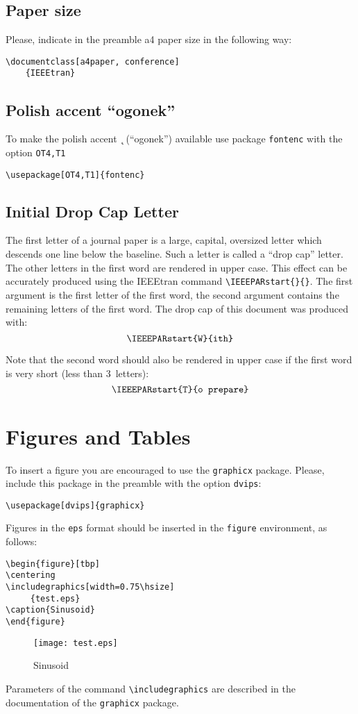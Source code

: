 \documentclass[conference]{IEEEtran}
\theoremstyle{definition}
\begin{document}
\subsection{Paper size}
Please, indicate in the preamble a4 paper size in the following way:





\begin{verbatim}
\documentclass[a4paper, conference]
    {IEEEtran}
\end{verbatim}


\subsection{Polish accent ``ogonek''}
To make the polish accent {\k \ } (``ogonek'') available use package \verb|fontenc| with the option \verb|OT4,T1|
\begin{verbatim}
\usepackage[OT4,T1]{fontenc}
\end{verbatim}

\subsection{Initial Drop Cap Letter}
 The first letter of a journal paper is a large, capital, oversized
letter which descends one line below the baseline. Such a
letter is called a ``drop cap'' letter. The other letters in the first
word are rendered in upper case. This effect can be accurately
produced using the IEEEtran command \verb|\IEEEPARstart{}{}|. The first argument is the first letter of the first word, the
second argument contains the remaining letters of the first
word. The drop cap of this document was produced with:
$$\verb|\IEEEPARstart{W}{ith}|$$

Note that the second word should also be rendered  in
upper case if the first word is very short (less than 3~letters):
$$\verb|\IEEEPARstart{T}{o prepare}|$$


\section{Figures and Tables}
To insert a figure you are encouraged to use the  \verb|graphicx| package. Please, include this package in the preamble with the option \verb|dvips|:
\begin{verbatim}
\usepackage[dvips]{graphicx}
\end{verbatim}
Figures in the \verb|eps| format should be inserted in the \verb|figure| environment, as follows:
\begin{verbatim}
\begin{figure}[tbp]
\centering
\includegraphics[width=0.75\hsize]
     {test.eps}
\caption{Sinusoid}
\end{figure}
\end{verbatim}
%
\begin{figure}[tbp]
\centering
\texttt{[image: test.eps]}
\caption{Sinusoid}
\end{figure}
%
Parameters of the command \verb|\includegraphics| are described in the documentation of the \verb|graphicx| package.
\end{document}
